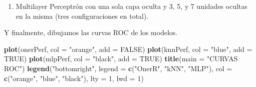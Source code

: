 \documentclass[]{article}
\newenvironment{Shaded}{\begin{snugshade}}{\end{snugshade}}
\newcommand{\DataTypeTok}[1]{\textcolor[rgb]{0.13,0.29,0.53}{#1}}
\newcommand{\DecValTok}[1]{\textcolor[rgb]{0.00,0.00,0.81}{#1}}
\newcommand{\KeywordTok}[1]{\textcolor[rgb]{0.13,0.29,0.53}{\textbf{#1}}}
\newcommand{\NormalTok}[1]{#1}
\newcommand{\OperatorTok}[1]{\textcolor[rgb]{0.81,0.36,0.00}{\textbf{#1}}}
\newcommand{\OtherTok}[1]{\textcolor[rgb]{0.56,0.35,0.01}{#1}}
\newcommand{\StringTok}[1]{\textcolor[rgb]{0.31,0.60,0.02}{#1}}
\providecommand{\tightlist}{%
  \setlength{\itemsep}{0pt}\setlength{\parskip}{0pt}}
\begin{document}
\begin{Shaded}
\end{Shaded}

\begin{enumerate}
\def\labelenumi{\arabic{enumi}.}
\setcounter{enumi}{2}
\tightlist
\item
  Multilayer Perceptrón con una sola capa oculta y 3, 5, y 7 unidades ocultas en la misma (tres configuraciones en total).
\end{enumerate}

\begin{Shaded}
\end{Shaded}

Y finalmente, dibujamos las curvas ROC de los modelos.

\begin{Shaded}
\begin{Highlighting}[]
\KeywordTok{plot}\NormalTok{(onerPerf, }\DataTypeTok{col =} \StringTok{"orange"}\NormalTok{, }\DataTypeTok{add =} \OtherTok{FALSE}\NormalTok{)}
\KeywordTok{plot}\NormalTok{(knnPerf, }\DataTypeTok{col =} \StringTok{"blue"}\NormalTok{, }\DataTypeTok{add =} \OtherTok{TRUE}\NormalTok{)}
\KeywordTok{plot}\NormalTok{(mlpPerf, }\DataTypeTok{col =} \StringTok{"black"}\NormalTok{, }\DataTypeTok{add =} \OtherTok{TRUE}\NormalTok{)}
\KeywordTok{title}\NormalTok{(}\DataTypeTok{main =} \StringTok{"CURVAS ROC"}\NormalTok{)}
\KeywordTok{legend}\NormalTok{(}\StringTok{"bottomright"}\NormalTok{, }\DataTypeTok{legend =} \KeywordTok{c}\NormalTok{(}\StringTok{"OnerR"}\NormalTok{, }\StringTok{"kNN"}\NormalTok{, }\StringTok{"MLP"}\NormalTok{), }
	\DataTypeTok{col =} \KeywordTok{c}\NormalTok{(}\StringTok{"orange"}\NormalTok{, }\StringTok{"blue"}\NormalTok{, }\StringTok{"black"}\NormalTok{), }
	\DataTypeTok{lty =} \DecValTok{1}\NormalTok{, }\DataTypeTok{lwd =} \DecValTok{1}\NormalTok{)}
\end{Highlighting}
\end{Shaded}
\end{document}
